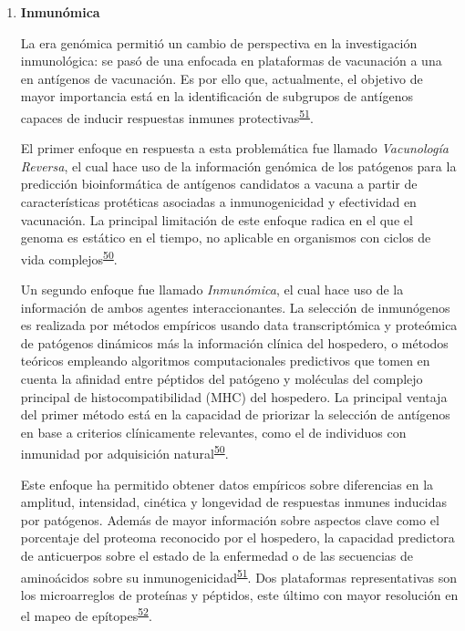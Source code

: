 \documentclass[]{article}
\begin{document}
\begin{enumerate}
  \begin{enumerate}
  \def\labelenumii{\roman{enumii}.}
  \item
    \textbf{Inmunómica}

    La era genómica permitió un cambio de perspectiva en la
    investigación inmunológica: se pasó de una enfocada en plataformas
    de vacunación a una en antígenos de vacunación. Es por ello que,
    actualmente, el objetivo de mayor importancia está en la
    identificación de subgrupos de antígenos capaces de inducir
    respuestas inmunes
    protectivas\textsuperscript{\protect\hyperlink{ref-Davies2015Large}{51}}.

    El primer enfoque en respuesta a esta problemática fue llamado
    \emph{Vacunología Reversa}, el cual hace uso de la información
    genómica de los patógenos para la predicción bioinformática de
    antígenos candidatos a vacuna a partir de características protéticas
    asociadas a inmunogenicidad y efectividad en vacunación. La
    principal limitación de este enfoque radica en el que el genoma es
    estático en el tiempo, no aplicable en organismos con ciclos de vida
    complejos\textsuperscript{\protect\hyperlink{ref-immunomics2016}{50}}.

    Un segundo enfoque fue llamado \emph{Inmunómica}, el cual hace uso
    de la información de ambos agentes interaccionantes. La selección de
    inmunógenos es realizada por métodos empíricos usando data
    transcriptómica y proteómica de patógenos dinámicos más la
    información clínica del hospedero, o métodos teóricos empleando
    algoritmos computacionales predictivos que tomen en cuenta la
    afinidad entre péptidos del patógeno y moléculas del complejo
    principal de histocompatibilidad (MHC) del hospedero. La principal
    ventaja del primer método está en la capacidad de priorizar la
    selección de antígenos en base a criterios clínicamente relevantes,
    como el de individuos con inmunidad por adquisición
    natural\textsuperscript{\protect\hyperlink{ref-immunomics2016}{50}}.

    Este enfoque ha permitido obtener datos empíricos sobre diferencias
    en la amplitud, intensidad, cinética y longevidad de respuestas
    inmunes inducidas por patógenos. Además de mayor información sobre
    aspectos clave como el porcentaje del proteoma reconocido por el
    hospedero, la capacidad predictora de anticuerpos sobre el estado de
    la enfermedad o de las secuencias de aminoácidos sobre su
    inmunogenicidad\textsuperscript{\protect\hyperlink{ref-Davies2015Large}{51}}.
    Dos plataformas representativas son los microarreglos de proteínas y
    péptidos, este último con mayor resolución en el mapeo de
    epítopes\textsuperscript{\protect\hyperlink{ref-carmona2015peptide}{52}}.
  \end{enumerate}
\end{enumerate}
\end{document}
